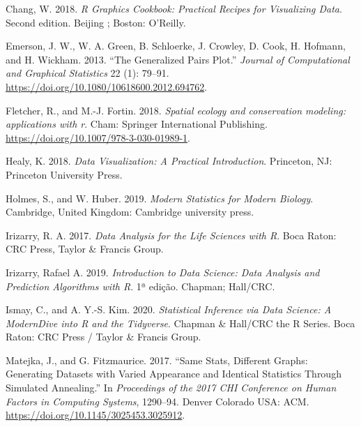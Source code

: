 \documentclass[
]{article}
\newlength{\cslhangindent}
\newlength{\cslentryspacingunit} %
\newenvironment{CSLReferences}[2] %
 {%
  \setlength{\parindent}{0pt}
  \ifodd #1
  \let\oldpar\par
  \def\par{\hangindent=\cslhangindent\oldpar}
  \fi
  \setlength{\parskip}{#2\cslentryspacingunit}
 }%
 {}
\begin{document}
\hypertarget{refs}{}
\begin{CSLReferences}{1}{0}
\leavevmode{}%
Chang, W. 2018. \emph{R Graphics Cookbook: Practical Recipes for Visualizing Data}. Second edition. Beijing ; Boston: O'Reilly.

\leavevmode{}%
Emerson, J. W., W. A. Green, B. Schloerke, J. Crowley, D. Cook, H. Hofmann, and H. Wickham. 2013. {``The {Generalized} {Pairs} {Plot}.''} \emph{Journal of Computational and Graphical Statistics} 22 (1): 79--91. \url{https://doi.org/10.1080/10618600.2012.694762}.

\leavevmode{}%
Fletcher, R., and M.-J. Fortin. 2018. \emph{{Spatial ecology and conservation modeling: applications with r}}. Cham: Springer International Publishing. \url{https://doi.org/10.1007/978-3-030-01989-1}.

\leavevmode{}%
Healy, K. 2018. \emph{Data Visualization: A Practical Introduction}. Princeton, NJ: Princeton University Press.

\leavevmode{}%
Holmes, S., and W. Huber. 2019. \emph{Modern Statistics for Modern Biology}. Cambridge, United Kingdom: Cambridge university press.

\leavevmode{}%
Irizarry, R. A. 2017. \emph{Data Analysis for the Life Sciences with {R}}. Boca Raton: CRC Press, Taylor \& Francis Group.

\leavevmode{}%
Irizarry, Rafael A. 2019. \emph{Introduction to {Data} {Science}: {Data} {Analysis} and {Prediction} {Algorithms} with {R}}. 1ª edição. Chapman; Hall/CRC.

\leavevmode{}%
Ismay, C., and A. Y.-S. Kim. 2020. \emph{Statistical Inference via Data Science: A {ModernDive} into {R} and the {Tidyverse}}. Chapman \& {Hall}/{CRC} the {R} {Series}. Boca Raton: CRC Press / Taylor \& Francis Group.

\leavevmode{}%
Matejka, J., and G. Fitzmaurice. 2017. {``Same {Stats}, {Different} {Graphs}: {Generating} {Datasets} with {Varied} {Appearance} and {Identical} {Statistics} Through {Simulated} {Annealing}.''} In \emph{Proceedings of the 2017 {CHI} {Conference} on {Human} {Factors} in {Computing} {Systems}}, 1290--94. Denver Colorado USA: ACM. \url{https://doi.org/10.1145/3025453.3025912}.


\end{CSLReferences}
\end{document}
